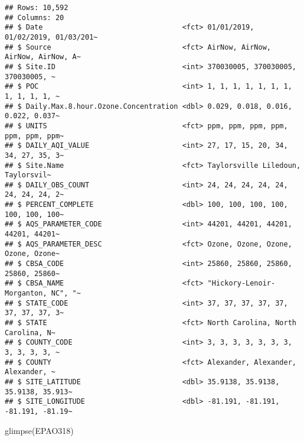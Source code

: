 \documentclass[
]{article}
\newenvironment{Shaded}{\begin{snugshade}}{\end{snugshade}}
\newcommand{\FunctionTok}[1]{\textcolor[rgb]{0.00,0.00,0.00}{#1}}
\newcommand{\NormalTok}[1]{#1}
\begin{document}
\begin{verbatim}
## Rows: 10,592
## Columns: 20
## $ Date                                 <fct> 01/01/2019, 01/02/2019, 01/03/201~
## $ Source                               <fct> AirNow, AirNow, AirNow, AirNow, A~
## $ Site.ID                              <int> 370030005, 370030005, 370030005, ~
## $ POC                                  <int> 1, 1, 1, 1, 1, 1, 1, 1, 1, 1, 1, ~
## $ Daily.Max.8.hour.Ozone.Concentration <dbl> 0.029, 0.018, 0.016, 0.022, 0.037~
## $ UNITS                                <fct> ppm, ppm, ppm, ppm, ppm, ppm, ppm~
## $ DAILY_AQI_VALUE                      <int> 27, 17, 15, 20, 34, 34, 27, 35, 3~
## $ Site.Name                            <fct> Taylorsville Liledoun, Taylorsvil~
## $ DAILY_OBS_COUNT                      <int> 24, 24, 24, 24, 24, 24, 24, 24, 2~
## $ PERCENT_COMPLETE                     <dbl> 100, 100, 100, 100, 100, 100, 100~
## $ AQS_PARAMETER_CODE                   <int> 44201, 44201, 44201, 44201, 44201~
## $ AQS_PARAMETER_DESC                   <fct> Ozone, Ozone, Ozone, Ozone, Ozone~
## $ CBSA_CODE                            <int> 25860, 25860, 25860, 25860, 25860~
## $ CBSA_NAME                            <fct> "Hickory-Lenoir-Morganton, NC", "~
## $ STATE_CODE                           <int> 37, 37, 37, 37, 37, 37, 37, 37, 3~
## $ STATE                                <fct> North Carolina, North Carolina, N~
## $ COUNTY_CODE                          <int> 3, 3, 3, 3, 3, 3, 3, 3, 3, 3, 3, ~
## $ COUNTY                               <fct> Alexander, Alexander, Alexander, ~
## $ SITE_LATITUDE                        <dbl> 35.9138, 35.9138, 35.9138, 35.913~
## $ SITE_LONGITUDE                       <dbl> -81.191, -81.191, -81.191, -81.19~
\end{verbatim}

\begin{Shaded}
\begin{Highlighting}[]
\FunctionTok{glimpse}\NormalTok{(EPAO318)}
\end{Highlighting}
\end{Shaded}
\end{document}
